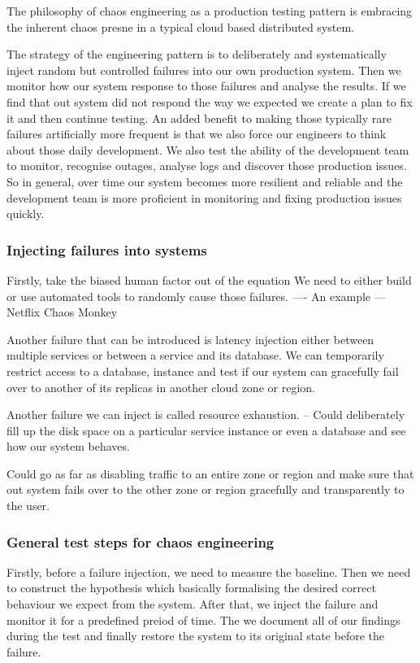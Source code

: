 \documentclass[a4paper, 11pt]{book}
\begin{document}
    The philosophy of chaos engineering as a production testing pattern is embracing the inherent chaos presne in a typical cloud based distributed system.

    The strategy of the engineering pattern is to deliberately and systematically inject random but controlled failures into our own production system.
    Then we monitor how our system response to those failures and analyse the results.
    If we find that out system did not respond the way we expected we create a plan to fix it and then continue testing.
    An added benefit to making those typically rare failures artificially more frequent is that we also force our engineers to think about those daily development.
    We also test the ability of the development team to monitor, recognise outages, analyse logs and discover those production issues.
    So in general, over time our system becomes more resilient and reliable and the development team is more proficient in monitoring and fixing production issues quickly.

    \subsubsection{Injecting failures into systems}
    Firstly, take the biased human factor out of the equation
    We need to either build or use automated tools to randomly cause those failures.
    ---- An example --- Netflix Chaos Monkey

    Another failure that can be introduced is latency injection either between multiple services or between a service and its database.
    We can temporarily restrict access to a database, instance and test if our system can gracefully fail over to another of its replicas in another cloud zone or region.

    Another failure we can inject is called resource exhaustion.
    -- Could deliberately fill up the disk space on a particular service instance or even a database and see how our system behaves.

    Could go as far as disabling traffic to an entire zone or region and make sure that out system fails over to the other zone or region gracefully and transparently to the user.

    \subsubsection{General test steps for chaos engineering}
    Firstly, before a failure injection, we need to measure the baseline.
    Then we need to construct the hypothesis which basically formalising the desired correct behaviour we expect from the system.
    After that, we inject the failure and monitor it for a predefined preiod of time.
    The we document all of our findings during the test and finally restore the system to its original state before the failure.
\end{document}

